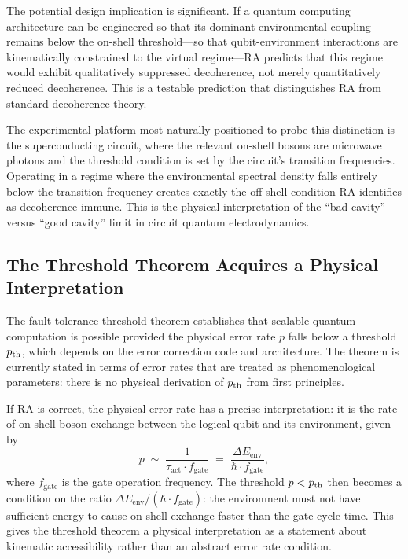 \documentclass[11pt,a4paper]{article}
\theoremstyle{plain}
\theoremstyle{definition}
\theoremstyle{remark}
\begin{document}
The potential design implication is significant. If a quantum computing
architecture can be engineered so that its dominant environmental coupling remains
below the on-shell threshold---so that qubit-environment interactions are
kinematically constrained to the virtual regime---RA predicts that this regime
would exhibit qualitatively suppressed decoherence, not merely quantitatively
reduced decoherence. This is a testable prediction that distinguishes RA from
standard decoherence theory.

The experimental platform most naturally positioned to probe this distinction is
the superconducting circuit, where the relevant on-shell bosons are microwave
photons and the threshold condition is set by the circuit's transition frequencies.
Operating in a regime where the environmental spectral density falls entirely below
the transition frequency creates exactly the off-shell condition RA identifies as
decoherence-immune. This is the physical interpretation of the ``bad cavity''
versus ``good cavity'' limit in circuit quantum electrodynamics.

\subsection{The Threshold Theorem Acquires a Physical Interpretation}

The fault-tolerance threshold theorem establishes that scalable quantum computation
is possible provided the physical error rate $p$ falls below a threshold $p_{\rm
th}$, which depends on the error correction code and architecture. The theorem is
currently stated in terms of error rates that are treated as phenomenological
parameters: there is no physical derivation of $p_{\rm th}$ from first principles.

If RA is correct, the physical error rate has a precise interpretation: it is the
rate of on-shell boson exchange between the logical qubit and its environment,
given by
\begin{equation}
  p \;\sim\; \frac{1}{\tau_{\mathrm{act}} \cdot f_{\mathrm{gate}}}
  \;=\; \frac{\Delta E_{\mathrm{env}}}{\hbar \cdot f_{\mathrm{gate}}},
\end{equation}
where $f_{\mathrm{gate}}$ is the gate operation frequency. The threshold
$p < p_{\rm th}$ then becomes a condition on the ratio
$\Delta E_{\mathrm{env}} / (\hbar \cdot f_{\mathrm{gate}})$: the environment must
not have sufficient energy to cause on-shell exchange faster than the gate cycle
time. This gives the threshold theorem a physical interpretation as a statement
about kinematic accessibility rather than an abstract error rate condition.
\end{document}
